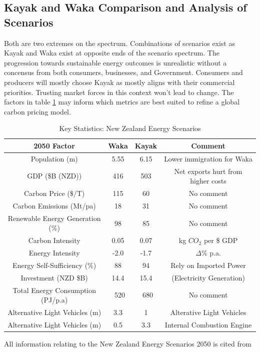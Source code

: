 \documentclass[12pt]{article}
\begin{document}
    \subsection{Kayak and Waka Comparison and Analysis of Scenarios}
    Both are two extremes on the spectrum. Combinations of scenarios exist as Kayak and Waka exist at
    opposite ends of the scenario spectrum. The progression towards sustainable energy outcomes is unrealistic 
    without a concensus from both consumers, businesses, and Government. Consumers and producers will mostly choose
    Kayak as mostly aligns with their commercial priorities. Trusting market forces in this context won't lead to change.
    The factors in table \ref{KS:WvsK} may inform which metrics are best suited to refine a global carbon pricing model.
    \begin{table}[H]
        \centering
        \begin{tabular}{||c|c|c|c||} 
         \hline
         2050 Factor & Waka& Kayak & Comment \\ 
         \hline
         Population (m)             & 5.55 & 6.15 & Lower immigration for Waka \\
         \hline 
         GDP (\$B (NZD))            & 416 & 503 & Net exports hurt from higher costs \\
         \hline 
         Carbon Price (\$/T)        & 115 & 60 & No comment \\
         \hline 
         Carbon Emissions (Mt/pa)   & 18 & 31 &  No comment \\
         \hline 
         Renewable Energy Generation (\%) & 98 & 85 & No comment \\
         \hline 
         Carbon Intensity   & 0.05 & 0.07 & kg $CO_{2}$ per \$ GDP \\
         \hline 
         Energy Intensity   & -2.0 & -1.7 & $\Delta$\% p.a. \\
         \hline 
         Energy Self-Sufficiency (\%)    &  88   &   94    & Rely on Imported Power    \\
         \hline 
         Investment (NZD \$B) & 14.4 & 15.4 & (Electricity Generation) \\
         \hline
         Total Energy Consumption (PJ/p.a) & ~520 & ~680 & No comment\\
         \hline
         Alternative Light Vehicles (m) & 3.3 & 1 & Alterative Light Vehicles\\
         \hline
         Alternative Light Vehicles (m) & 0.5 & 3.3 & Internal Combustion Engine\\
         \hline
        \end{tabular}
        \caption{Key Statistics: New Zealand Energy Scenarios}
        \label{KS:WvsK}
        \end{table}
    All information relating to the New Zealand Energy Scenarios 2050 is cited from \cite{TR:1}
\end{document}
